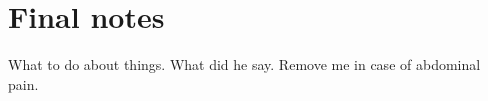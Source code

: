 \documentclass[12pt,chapterheads]{ucsd}
\begin{document}
%
%
%
%
%
%
%
%
%
%
%






\appendix
\chapter{Final notes}
What to do about things.  What did he say.
  Remove me in case of abdominal pain.



\end{document}
